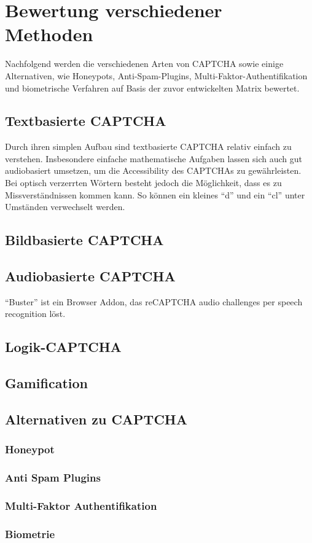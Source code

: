 \chapter{Bewertung verschiedener Methoden}

Nachfolgend werden die verschiedenen Arten von CAPTCHA sowie einige Alternativen, wie Honeypots, Anti-Spam-Plugins, 
Multi-Faktor-Authentifikation und biometrische Verfahren auf Basis der zuvor entwickelten Matrix bewertet. 

\section{Textbasierte CAPTCHA}

Durch ihren simplen Aufbau sind textbasierte CAPTCHA relativ einfach zu verstehen.
Insbesondere einfache mathematische Aufgaben lassen sich auch gut audiobasiert umsetzen, 
um die Accessibility des CAPTCHAs zu gewährleisten.
Bei optisch verzerrten Wörtern besteht jedoch die Möglichkeit, dass es zu Missverständnissen kommen kann.
So können ein kleines ``d'' und ein ``cl'' unter Umständen verwechselt werden.

\section{Bildbasierte CAPTCHA}

\section{Audiobasierte CAPTCHA}

“Buster” ist ein Browser Addon, das reCAPTCHA audio challenges per speech recognition löst.

\section{Logik-CAPTCHA}

\section{Gamification}

\section{Alternativen zu CAPTCHA}

\subsection{Honeypot}

\subsection{Anti Spam Plugins}

\subsection{Multi-Faktor Authentifikation}

\subsection{Biometrie}